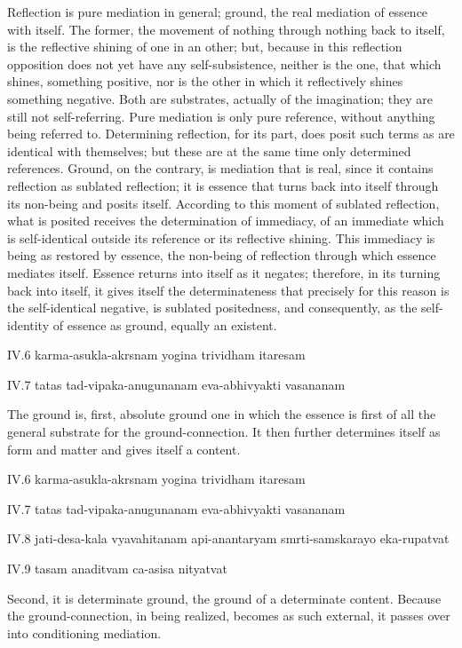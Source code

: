 Reflection is pure mediation in general;
ground, the real mediation of essence with itself.
The former, the movement of nothing through nothing back to itself,
is the reflective shining of one in an other;
but, because in this reflection opposition does not
yet have any self-subsistence,
neither is the one, that which shines, something positive,
nor is the other in which it reflectively shines something negative.
Both are substrates, actually of the imagination;
they are still not self-referring.
Pure mediation is only pure reference,
without anything being referred to.
Determining reflection, for its part, does posit
such terms as are identical with themselves;
but these are at the same time only determined references.
Ground, on the contrary, is mediation that is real,
since it contains reflection as sublated reflection;
it is essence that turns back into itself
through its non-being and posits itself.
According to this moment of sublated reflection,
what is posited receives the determination of immediacy,
of an immediate which is self-identical
outside its reference or its reflective shining.
This immediacy is being as restored by essence,
the non-being of reflection through which essence mediates itself.
Essence returns into itself as it negates;
therefore, in its turning back into itself,
it gives itself the determinateness that precisely
for this reason is the self-identical negative,
is sublated positedness, and consequently,
as the self-identity of essence as ground,
equally an existent.

IV.6
karma-asukla-akrsnam yogina trividham itaresam

IV.7
tatas tad-vipaka-anugunanam eva-abhivyakti vasananam

The ground is, first, absolute ground
one in which the essence is first of all
the general substrate for the ground-connection.
It then further determines itself as form and matter
and gives itself a content.

IV.6
karma-asukla-akrsnam yogina trividham itaresam

IV.7
tatas tad-vipaka-anugunanam eva-abhivyakti vasananam

IV.8
jati-desa-kala vyavahitanam api-anantaryam smrti-samskarayo eka-rupatvat

IV.9
tasam anaditvam ca-asisa nityatvat

Second, it is determinate ground,
the ground of a determinate content.
Because the ground-connection, in being realized,
becomes as such external,
it passes over into conditioning mediation.

